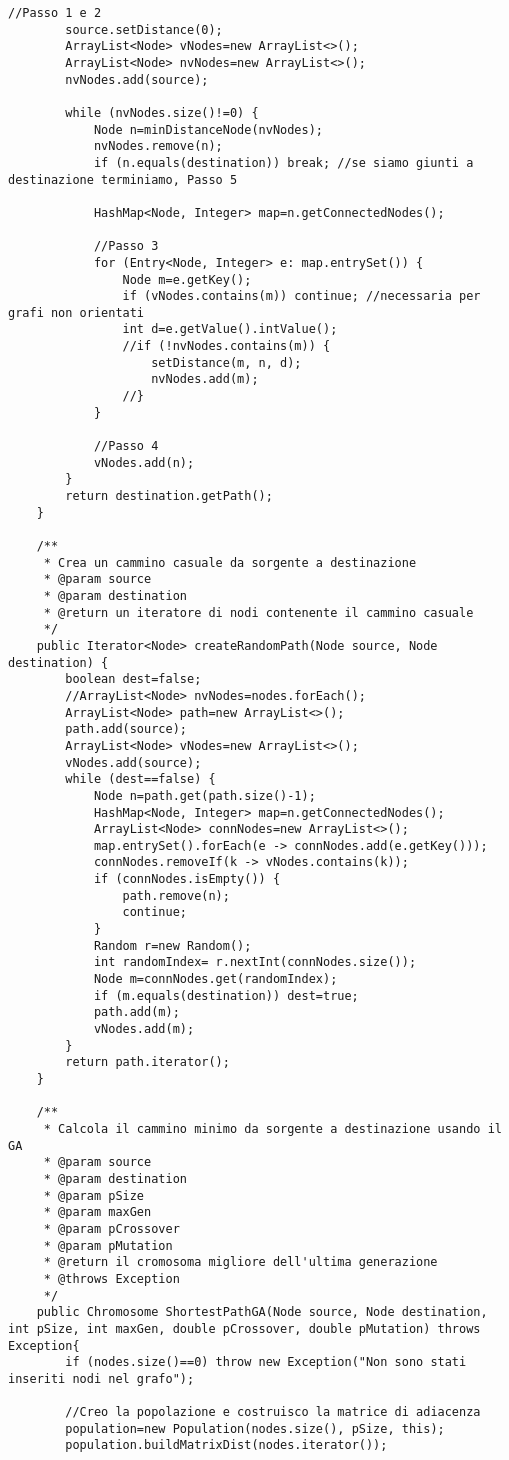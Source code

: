 \begin{lstlisting}[style=Java]
		//Passo 1 e 2
		source.setDistance(0);
		ArrayList<Node> vNodes=new ArrayList<>();
		ArrayList<Node> nvNodes=new ArrayList<>();
		nvNodes.add(source);
		
		while (nvNodes.size()!=0) {
			Node n=minDistanceNode(nvNodes);
			nvNodes.remove(n);
			if (n.equals(destination)) break; //se siamo giunti a destinazione terminiamo, Passo 5
			
			HashMap<Node, Integer> map=n.getConnectedNodes();
			
			//Passo 3
			for (Entry<Node, Integer> e: map.entrySet()) {
				Node m=e.getKey();
				if (vNodes.contains(m)) continue; //necessaria per grafi non orientati
				int d=e.getValue().intValue();
				//if (!nvNodes.contains(m)) {
					setDistance(m, n, d);
					nvNodes.add(m);
				//}
			}
			
			//Passo 4
			vNodes.add(n);
		}
		return destination.getPath();
	}
	
	/**
	 * Crea un cammino casuale da sorgente a destinazione
	 * @param source
	 * @param destination
	 * @return un iteratore di nodi contenente il cammino casuale
	 */
	public Iterator<Node> createRandomPath(Node source, Node destination) {
		boolean dest=false;
		//ArrayList<Node> nvNodes=nodes.forEach();
		ArrayList<Node> path=new ArrayList<>();
		path.add(source);
		ArrayList<Node> vNodes=new ArrayList<>();
		vNodes.add(source);
		while (dest==false) {
			Node n=path.get(path.size()-1);
			HashMap<Node, Integer> map=n.getConnectedNodes();
			ArrayList<Node> connNodes=new ArrayList<>();
			map.entrySet().forEach(e -> connNodes.add(e.getKey()));
			connNodes.removeIf(k -> vNodes.contains(k));
			if (connNodes.isEmpty()) {
				path.remove(n);
				continue;
			}
			Random r=new Random();
			int randomIndex= r.nextInt(connNodes.size());
			Node m=connNodes.get(randomIndex);
			if (m.equals(destination)) dest=true;
			path.add(m);
			vNodes.add(m);
		}
		return path.iterator();
	}
	
	/**
	 * Calcola il cammino minimo da sorgente a destinazione usando il GA
	 * @param source
	 * @param destination
	 * @param pSize
	 * @param maxGen
	 * @param pCrossover
	 * @param pMutation
	 * @return il cromosoma migliore dell'ultima generazione
	 * @throws Exception
	 */
	public Chromosome ShortestPathGA(Node source, Node destination, int pSize, int maxGen, double pCrossover, double pMutation) throws Exception{
		if (nodes.size()==0) throw new Exception("Non sono stati inseriti nodi nel grafo");
		
		//Creo la popolazione e costruisco la matrice di adiacenza
		population=new Population(nodes.size(), pSize, this);
		population.buildMatrixDist(nodes.iterator());
		

\end{lstlisting}
